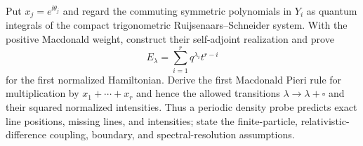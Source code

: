 \begin{exercise}
Put $x_j=e^{\ii\theta_j}$ and regard the commuting symmetric polynomials in
$Y_i$ as quantum integrals of the compact trigonometric
Ruijsenaars--Schneider system.  With the positive Macdonald weight, construct
their self-adjoint realization and prove
\[
 E_\lambda=\sum_{i=1}^rq^{\lambda_i}t^{r-i}
\]
for the first normalized Hamiltonian.  Derive the first Macdonald Pieri rule
for multiplication by $x_1+\cdots+x_r$ and hence the allowed transitions
$\lambda\to\lambda+\square$ and their squared normalized intensities.
Thus a periodic density probe predicts exact line positions, missing lines,
and intensities; state the finite-particle, relativistic-difference coupling,
boundary, and spectral-resolution assumptions.
\end{exercise}
